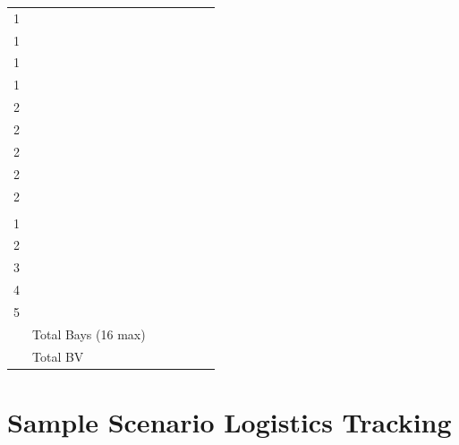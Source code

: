 \documentclass{article}
\begin{document}
\begin{table}[h!]
\begin{tabular}{| m{1.25em} m{11em} m{8em} R{4.7em} R{4.5em} R{3.5em} R{3.5em} |}
1 & & & & & & \\
1 & & & & & & \\
1 & & & & & & \\
1 & & & & & & \\
2 & & & & & & \\
2 & & & & & & \\
2 & & & & & & \\
2 & & & & & & \\
2 & & & & & & \\
\hline
{}  \\
  & & & & & & \\
2  & & & & & & \\
3  & & & & & & \\
4  & & & & & & \\
5  & & & & & & \\
\hline
  & Total Bays (16 max) & & & & & \\
  & Total BV   & & & & & \\
\hline
\end{tabular}
\end{table}

\newpage

\section{Sample Scenario Logistics Tracking}
\end{document}
